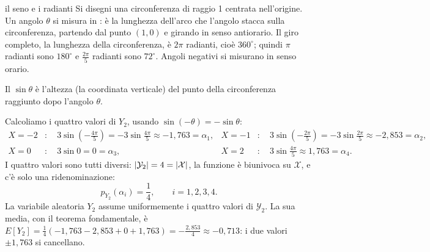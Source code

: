 \begin{richiamo}{il seno e i radianti}
Si disegni una circonferenza di raggio 1 centrata nell'origine. Un angolo $\theta$ si misura in : è la
lunghezza dell'arco che l'angolo stacca sulla circonferenza, partendo dal punto $(1, 0)$ e girando in senso
antiorario. Il giro completo, la lunghezza della circonferenza, è $2\pi$ radianti, cioè $360^\circ$; quindi $\pi$ radianti
sono $180^\circ$ e $\frac{2\pi}{5}$ radianti sono $72^\circ$. Angoli negativi si misurano in senso orario.

Il  $\sin\theta$ è l'altezza (la coordinata verticale) del punto della circonferenza raggiunto dopo
l'angolo $\theta$.
\begin{center}
\end{center}
\end{richiamo}

Calcoliamo i quattro valori di $Y_2$, usando $\sin(-\theta) = -\sin\theta$:
\[
\begin{aligned}
  X = -2 &: \quad 3 \sin\left(-\tfrac{4\pi}{5}\right) = -3 \sin\tfrac{4\pi}{5} \approx -1{,}763 = \alpha_1 , &
  X = -1 &: \quad 3 \sin\left(-\tfrac{2\pi}{5}\right) = -3 \sin\tfrac{2\pi}{5} \approx -2{,}853 = \alpha_2 , \\
  X = 0 &: \quad 3 \sin 0 = 0 = \alpha_3 , &
  X = 2 &: \quad 3 \sin\tfrac{4\pi}{5} \approx 1{,}763 = \alpha_4 .
\end{aligned}
\]
I quattro valori sono tutti diversi: $\left\lvert \mathcal{Y}_2 \right\rvert = 4 = \left\lvert \mathcal{X} \right\rvert$, la funzione è biunivoca su
$\mathcal{X}$, e c'è solo una ridenominazione:
\[ p_{Y_2}(\alpha_i) = \frac14 , \qquad i = 1, 2, 3, 4 . \]
La variabile aleatoria $Y_2$ assume uniformemente i quattro valori di $\mathcal{Y}_2$. La sua media, con il teorema
fondamentale, è $E[Y_2] = \frac14 (-1{,}763 - 2{,}853 + 0 + 1{,}763) = -\frac{2{,}853}{4} \approx -0{,}713$: i due
valori $\pm 1{,}763$ si cancellano.

